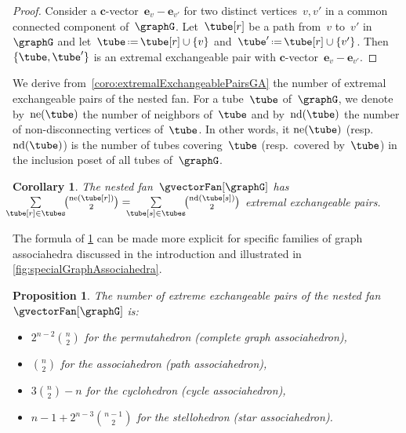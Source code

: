 \documentclass{amsart}
\newtheorem{corollary}[theorem]{Corollary}
\newtheorem{proposition}[theorem]{Proposition}
\theoremstyle{definition}
\renewcommand{\b}[1]{{\boldsymbol{#1}}} %
\newcommand{\eqdef}{\mbox{\,\raisebox{0.2ex}{\scriptsize\ensuremath{\mathrm:}}\ensuremath{=}\,}} %
\newcommand{\nonDisconnecting}{\mathrm{nd}} %
\newcommand{\neighbors}{\mathrm{ne}} %
\begin{document}
\begin{proof}
Consider a $\b{c}$-vector~$\b{e}_v - \b{e}_{v'}$ for two distinct vertices~$v, v'$ in a common connected component of~$\graphG$. Let~$\tube[r]$ be a path from~$v$ to~$v'$ in~$\graphG$ and let~$\tube \eqdef \tube[r] \cup \{v\}$ and~$\tube' \eqdef \tube[r] \cup \{v'\}$. Then $\{\tube, \tube'\}$ is an extremal exchangeable pair with $\b{c}$-vector~$\b{e}_v - \b{e}_{v'}$.
\end{proof}

We derive from~\cref{coro:extremalExchangeablePairsGA} the number of extremal exchangeable pairs of the nested fan.
For a tube~$\tube$ of~$\graphG$, we denote by~$\neighbors(\tube)$ the number of neighbors of~$\tube$ and by~$\nonDisconnecting(\tube)$ the number of non-disconnecting vertices of~$\tube$.
In other words, it $\neighbors(\tube)$ (resp.~$\nonDisconnecting(\tube)$) is the number of tubes covering~$\tube$ (resp.~covered by~$\tube$) in the inclusion poset of all tubes of~$\graphG$.

\begin{corollary}
\label{coro:numberExtremalExchangeablePairsGA}
The nested fan~$\gvectorFan[\graphG]$ has~$\!\!\!\! \sum\limits_{\tube[r] \in \tubes} \!\! \binom{\neighbors(\tube[r])}{2} = \!\!\!\! \sum\limits_{\tube[s] \in \tubes} \!\! \binom{\nonDisconnecting(\tube[s])}{2}$ extremal exchangeable pairs.
\end{corollary}


The formula of \cref{coro:numberExtremalExchangeablePairsGA} can be made more explicit for specific families of graph associahedra discussed in the introduction and illustrated in \cref{fig:specialGraphAssociahedra}.

\begin{proposition}
The number of extreme exchangeable pairs of the nested fan~$\gvectorFan[\graphG]$ is:
\begin{itemize}
\item $2^{n-2}\binom{n}{2}$ for the permutahedron (complete graph associahedron),
\item $\binom{n}{2}$ for the associahedron (path associahedron),
\item $3\binom{n}{2} - n$ for the cyclohedron (cycle associahedron),
\item $n-1+2^{n-3}\binom{n-1}{2}$ for the stellohedron (star associahedron).
\end{itemize}
\end{proposition}
\end{document}
